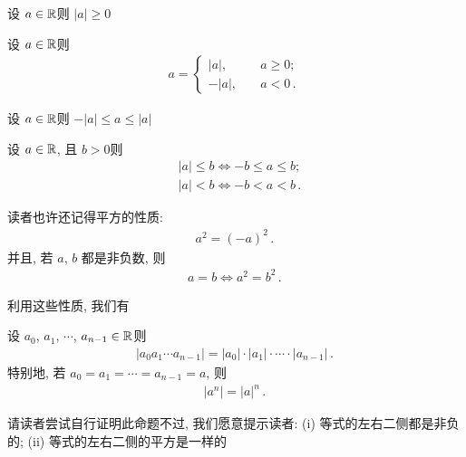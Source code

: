 \begin{proposition}
    设 $a \in \mathbb{R}$\period 则 $|a| \geq 0$\period
\end{proposition}

\begin{proposition}
    设 $a \in \mathbb{R}$\period 则
    \begin{align*}
        a = \begin{cases}
            |a|,  & \quad a \geq 0;     \\
            -|a|, & \quad a < 0 \period
        \end{cases}
    \end{align*}
\end{proposition}

\begin{proposition}
    设 $a \in \mathbb{R}$\period 则 $-|a| \leq a \leq |a|$\period
\end{proposition}

\begin{proposition}
    设 $a \in \mathbb{R}$, 且 $b > 0$\period 则
    \begin{align*}
         & |a| \leq b \iff -b \leq a \leq b; \\
         & |a| < b \iff -b < a < b \period
    \end{align*}
\end{proposition}

读者也许还记得平方的性质:
\begin{align*}
    a^2 = (-a)^2 \period
\end{align*}
并且, 若 $a$, $b$ 都是非负数, 则
\begin{align*}
    a = b \iff a^2 = b^2 \period
\end{align*}

利用这些性质, 我们有

\begin{proposition}
    设 $a_0$, $a_1$, $\cdots$, $a_{n-1} \in \mathbb{R}$\period 则
    \begin{align*}
        |a_0 a_1 \cdots a_{n-1}| = |a_0| \cdot |a_1| \cdot \cdots \cdot |a_{n-1}| \period
    \end{align*}
    特别地, 若 $a_0 = a_1 = \cdots = a_{n-1} = a$, 则
    \begin{align*}
        |a^n| = |a|^n \period
    \end{align*}
\end{proposition}

\begin{pf}
    请读者尝试自行证明此命题\period 不过, 我们愿意提示读者: (i) 等式的左右二侧都是非负的; (ii) 等式的左右二侧的平方是一样的\period
\end{pf}

